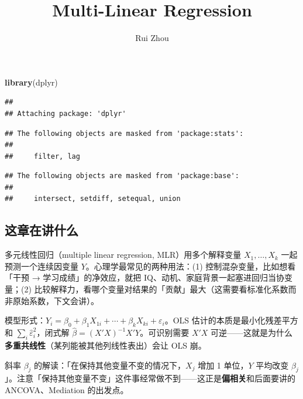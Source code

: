 \documentclass[
]{ctexart}
\title{Multi-Linear Regression}
\author{Rui Zhou}
\date{}
\newenvironment{Shaded}{\begin{snugshade}}{\end{snugshade}}
\newcommand{\FunctionTok}[1]{\textcolor[rgb]{0.13,0.29,0.53}{\textbf{#1}}}
\newcommand{\NormalTok}[1]{#1}
\begin{document}
\maketitle

{
\setcounter{tocdepth}{2}
\tableofcontents
}
\begin{Shaded}
\begin{Highlighting}[]
\FunctionTok{library}\NormalTok{(dplyr)}
\end{Highlighting}
\end{Shaded}

\begin{verbatim}
## 
## Attaching package: 'dplyr'
\end{verbatim}

\begin{verbatim}
## The following objects are masked from 'package:stats':
## 
##     filter, lag
\end{verbatim}

\begin{verbatim}
## The following objects are masked from 'package:base':
## 
##     intersect, setdiff, setequal, union
\end{verbatim}

\hypertarget{ux8fd9ux7ae0ux5728ux8bb2ux4ec0ux4e48}{%
\subsection{这章在讲什么}\label{ux8fd9ux7ae0ux5728ux8bb2ux4ec0ux4e48}}

多元线性回归（multiple linear regression, MLR）用多个解释变量
\(X_1, \ldots, X_k\) 一起预测一个连续因变量
\(Y\)。心理学最常见的两种用法：(1) 控制混杂变量，比如想看「干预 →
学习成绩」的净效应，就把 IQ、动机、家庭背景一起塞进回归当协变量；(2)
比较解释力，看哪个变量对结果的「贡献」最大（这需要看标准化系数而非原始系数，下文会讲）。

\begin{concept}
模型形式：$Y_i = \beta_0 + \beta_1 X_{1i} + \cdots + \beta_k X_{ki} + \varepsilon_i$。OLS 估计的本质是最小化残差平方和 $\sum_i \hat\varepsilon_i^2$，闭式解 $\hat\beta = (X'X)^{-1} X'Y$。可识别需要 $X'X$ 可逆——这就是为什么\textbf{多重共线性}（某列能被其他列线性表出）会让 OLS 崩。

斜率 $\beta_j$ 的解读：「在保持其他变量不变的情况下，$X_j$ 增加 1 单位，$Y$ 平均改变 $\beta_j$」。注意「保持其他变量不变」这件事经常做不到——这正是\textbf{偏相关}和后面要讲的 ANCOVA、Mediation 的出发点。
\end{concept}
\end{document}
